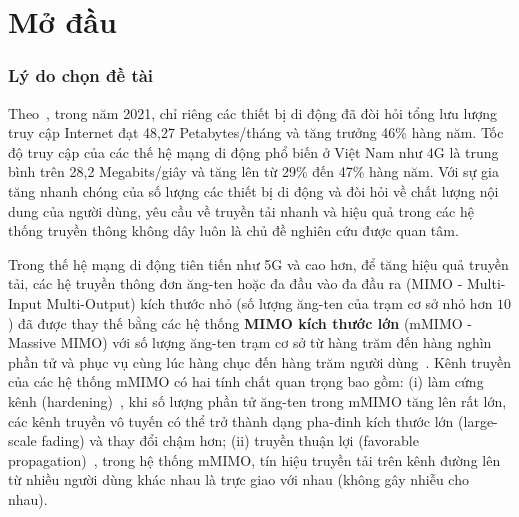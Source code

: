 \clearpage
{}

\chapter*{Mở đầu}
\label{sec:intro}

\subsection*{Lý do chọn đề tài}

Theo~\cite{Mtawa2019}, trong năm 2021, chỉ riêng các thiết bị di động đã đòi hỏi tổng lưu lượng truy cập Internet đạt 48,27 Petabytes/tháng và tăng trưởng 46\% hàng năm. Tốc độ truy cập của các thế hệ mạng di động phổ biến ở Việt Nam như 4G là trung bình trên 28,2 Megabits/giây và tăng lên từ 29\% đến 47\% hàng năm. Với sự gia tăng nhanh chóng của số lượng các thiết bị di động và đòi hỏi về chất lượng nội dung của người dùng, yêu cầu về truyền tải nhanh và hiệu quả trong các hệ thống truyền thông không dây luôn là chủ đề nghiên cứu được quan tâm.

Trong thế hệ mạng di động tiên tiến như 5G và cao hơn, để tăng hiệu quả truyền tải, các hệ truyền thông đơn ăng-ten hoặc đa đầu vào đa đầu ra (MIMO - Multi-Input Multi-Output) kích thước nhỏ (số lượng ăng-ten của trạm cơ sở nhỏ hơn $10$) đã được thay thế bằng các hệ thống \textbf{MIMO kích thước lớn} (mMIMO - Massive MIMO) với số lượng ăng-ten trạm cơ sở từ hàng trăm đến hàng nghìn phần tử và phục vụ cùng lúc hàng chục đến hàng trăm người dùng~\cite{Larsson2014}. Kênh truyền của các hệ thống mMIMO có hai tính chất quan trọng bao gồm: (i) làm cứng kênh (hardening)~\cite{Willhammar2020}, khi số lượng phần tử ăng-ten trong mMIMO tăng lên rất lớn, các kênh truyền vô tuyến có thể trở thành dạng pha-đinh kích thước lớn (large-scale fading) và thay đổi chậm hơn; (ii) truyền thuận lợi (favorable propagation)~\cite{Ngo2014}, trong hệ thống mMIMO, tín hiệu truyền tải trên kênh đường lên từ nhiều người dùng khác nhau là trực giao với nhau (không gây nhiễu cho nhau).

